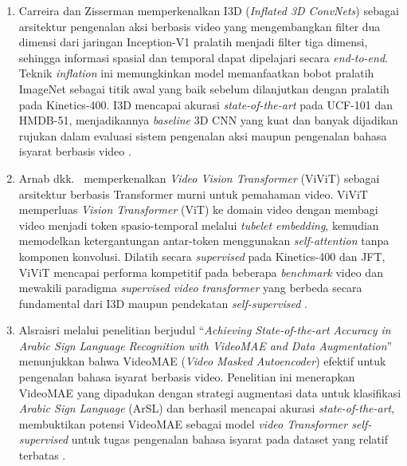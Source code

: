 \begin{enumerate}[noitemsep]
	\item Carreira dan Zisserman \cite{Carreira2017I3D} memperkenalkan I3D (\textit{Inflated 3D ConvNets}) sebagai arsitektur pengenalan aksi berbasis video yang mengembangkan filter dua dimensi dari jaringan Inception-V1 pralatih menjadi filter tiga dimensi, sehingga informasi spasial dan temporal dapat dipelajari secara \textit{end-to-end}. Teknik \textit{inflation} ini memungkinkan model memanfaatkan bobot pralatih ImageNet sebagai titik awal yang baik sebelum dilanjutkan dengan pralatih pada Kinetics-400. I3D mencapai akurasi \textit{state-of-the-art} pada UCF-101 dan HMDB-51, menjadikannya \textit{baseline} 3D CNN yang kuat dan banyak dijadikan rujukan dalam evaluasi sistem pengenalan aksi maupun pengenalan bahasa isyarat berbasis video \cite{Carreira2017I3D}.

	\item Arnab dkk.\ \cite{Arnab2021} memperkenalkan \textit{Video Vision Transformer} (ViViT) sebagai arsitektur berbasis Transformer murni untuk pemahaman video. ViViT memperluas \textit{Vision Transformer} (ViT) ke domain video dengan membagi video menjadi token spasio-temporal melalui \textit{tubelet embedding}, kemudian memodelkan ketergantungan antar-token menggunakan \textit{self-attention} tanpa komponen konvolusi. Dilatih secara \textit{supervised} pada Kinetics-400 dan JFT, ViViT mencapai performa kompetitif pada beberapa \textit{benchmark} video dan mewakili paradigma \textit{supervised video transformer} yang berbeda secara fundamental dari I3D maupun pendekatan \textit{self-supervised} \cite{Arnab2021}.

	\item Alsraisri \cite{Alsraisri2025} melalui penelitian berjudul ``\textit{Achieving State-of-the-art Accuracy in Arabic Sign Language Recognition with VideoMAE and Data Augmentation}'' menunjukkan bahwa VideoMAE (\textit{Video Masked Autoencoder}) efektif untuk pengenalan bahasa isyarat berbasis video. Penelitian ini menerapkan VideoMAE yang dipadukan dengan strategi augmentasi data untuk klasifikasi \textit{Arabic Sign Language} (ArSL) dan berhasil mencapai akurasi \textit{state-of-the-art}, membuktikan potensi VideoMAE sebagai model \textit{video Transformer self-supervised} untuk tugas pengenalan bahasa isyarat pada dataset yang relatif terbatas \cite{Alsraisri2025}.


\end{enumerate}

